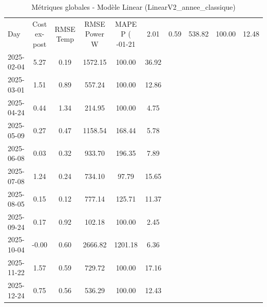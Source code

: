 \begin{table}
\caption{Métriques globales - Modèle Linear (LinearV2_annee_classique)}
\label{tab:Linear_LinearV2_annee_classique_Validation_EPlus_sans_Opti}
\begin{small}
\begin{tabular}{lccccc}
\toprule
Day & Cost ex-post & RMSE Temp & RMSE Power W & MAPE P (%
-01-21 & 2.01 & 0.59 & 538.82 & 100.00 & 12.48 \\
2025-02-04 & 5.27 & 0.19 & 1572.15 & 100.00 & 36.92 \\
2025-03-01 & 1.51 & 0.89 & 557.24 & 100.00 & 12.86 \\
2025-04-24 & 0.44 & 1.34 & 214.95 & 100.00 & 4.75 \\
2025-05-09 & 0.27 & 0.47 & 1158.54 & 168.44 & 5.78 \\
2025-06-08 & 0.03 & 0.32 & 933.70 & 196.35 & 7.89 \\
2025-07-08 & 1.24 & 0.24 & 734.10 & 97.79 & 15.65 \\
2025-08-05 & 0.15 & 0.12 & 777.14 & 125.71 & 11.37 \\
2025-09-24 & 0.17 & 0.92 & 102.18 & 100.00 & 2.45 \\
2025-10-04 & -0.00 & 0.60 & 2666.82 & 1201.18 & 6.36 \\
2025-11-22 & 1.57 & 0.59 & 729.72 & 100.00 & 17.16 \\
2025-12-24 & 0.75 & 0.56 & 536.29 & 100.00 & 12.43 \\
\bottomrule
\end{tabular}
\end{small}
\end{table}

